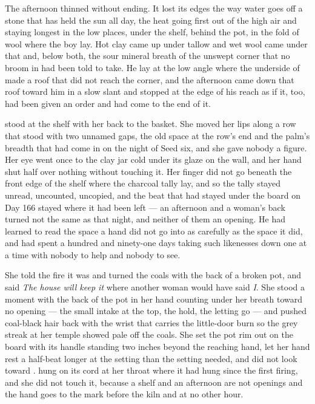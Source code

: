 The afternoon thinned without ending. It lost its edges the way water goes off a stone that has held the sun all day, the heat going first out of the high air and staying longest in the low places, under the shelf, behind the pot, in the fold of wool where the boy lay. Hot clay came up under tallow and wet wool came under that and, below both, the sour mineral breath of the unswept corner that no broom in  had been told to take. He lay at the low angle where the underside of  made a roof that did not reach the corner, and the afternoon came down that roof toward him in a slow slant and stopped at the edge of his reach as if it, too, had been given an order and had come to the end of it.

 stood at the shelf with her back to the basket. She moved her lips along a row that stood with two unnamed gaps, the old space at the row's end and the palm's breadth that had come in on the night of Seed six, and she gave nobody a figure. Her eye went once to the clay jar cold under its glaze on the wall, and her hand shut half over nothing without touching it. Her finger did not go beneath the front edge of the shelf where the charcoal tally lay, and so the tally stayed unread, uncounted, uncopied, and the beat that had stayed under the board on Day 166 stayed where it had been left --- an afternoon and a woman's back turned not the same as that night, and neither of them an opening. He had learned to read the space a hand did not go into as carefully as the space it did, and had spent a hundred and ninety-one days taking such likenesses down one at a time with nobody to help and nobody to see.

She told the fire it was  and turned the coals with the back of a broken pot, and said \emph{The house will keep it} where another woman would have said \emph{I}. She stood a moment with the back of the pot in her hand counting under her breath toward no opening --- the small intake at the top, the hold, the letting go --- and pushed coal-black hair back with the wrist that carries the little-door burn so the grey streak at her temple showed pale off the coals. She set the pot rim out on the board with its handle standing two inches beyond the reaching hand, let her hand rest a half-beat longer at the setting than the setting needed, and did not look toward .  hung on its cord at her throat where it had hung since the first firing, and she did not touch it, because a shelf and an afternoon are not openings and the hand goes to the mark before the kiln and at no other hour.

